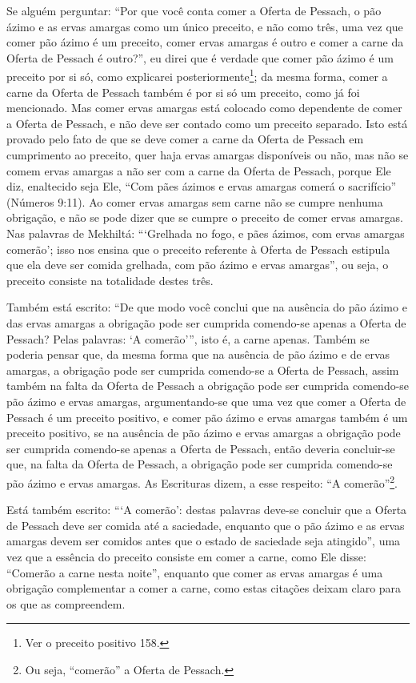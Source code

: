 Se alguém perguntar: ``Por que você conta comer a Oferta de Pessach, o
pão ázimo e as ervas amargas como um único preceito, e não como três,
uma vez que comer pão ázimo é um preceito, comer ervas amargas é outro
e comer a carne da Oferta de Pessach é outro?'', eu direi que é verdade
que comer pão ázimo é um preceito por si só, como explicarei
posteriormente\footnote{Ver o preceito positivo 158.}; da mesma forma, comer a carne da
Oferta de Pessach também é por si só um preceito, como já foi
mencionado. Mas comer ervas amargas está colocado como dependente de
comer a Oferta de Pessach, e não deve ser contado como um preceito
separado. Isto está provado pelo fato de que se deve comer a carne da
Oferta de Pessach em cumprimento ao preceito, quer haja ervas amargas
disponíveis ou não, mas não se comem ervas amargas
a não ser com a carne da Oferta de Pessach, porque Ele diz,
enaltecido seja Ele, ``Com pães ázimos e ervas amargas comerá o
sacrifício'' (Números 9:11). Ao comer ervas amargas sem carne não se
cumpre nenhuma obrigação, e não se pode dizer que se cumpre o preceito
de comer ervas amargas. Nas palavras de Mekhiltá: ```Grelhada no fogo, e
pães ázimos, com ervas amargas comerão'; isso nos ensina que o preceito
referente à Oferta de Pessach estipula que ela deve ser comida
grelhada, com pão ázimo e ervas amargas'', ou seja, o preceito consiste
na totalidade destes três.

Também está escrito: ``De que modo você conclui que na ausência do pão
ázimo e das ervas amargas a obrigação pode ser cumprida comendo-se
apenas a Oferta de Pessach? Pelas palavras: `A comerão''', isto é, a
carne apenas. Também se poderia pensar que, da mesma forma que na
ausência de pão ázimo e de ervas amargas, a obrigação pode ser cumprida
comendo-se a Oferta de Pessach, assim também na falta da Oferta de
Pessach a obrigação pode ser cumprida comendo-se pão ázimo e ervas
amargas, argumentando-se que uma vez que comer a Oferta de Pessach é
um preceito positivo, e comer pão ázimo e ervas amargas também é um
preceito positivo, se na ausência de pão ázimo e ervas amargas a
obrigação pode ser cumprida comendo-se apenas a Oferta de Pessach,
então deveria concluir-se que, na falta da Oferta de Pessach, a
obrigação pode ser cumprida comendo-se pão ázimo e ervas amargas. As
Escrituras dizem, a esse respeito: ``A comerão''\footnote{Ou seja, ``comerão'' a Oferta de Pessach.}.

Está também escrito: ```A comerão': destas palavras deve-se concluir que
a Oferta de Pessach deve ser comida até a saciedade, enquanto que o pão
ázimo e as ervas amargas devem ser comidos antes que o estado de
saciedade seja atingido'', uma vez que a essência do preceito consiste
em comer a carne, como Ele disse: ``Comerão a carne nesta noite'',
enquanto que comer as ervas amargas é uma obrigação complementar a comer
a carne, como estas citações deixam claro para os que as compreendem.

